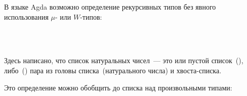 
В языке Agda возможно определение рекурсивных типов без явного
использования $\mu$- или $W$-типов:

\begin{code}%
\>  \AgdaSymbol{:}  \<%
\\
\>[0]\<[2]%
\>[2]\AgdaInductiveConstructor{[]} \AgdaSymbol{:} \<%
\\
\>[0]\<[2]%
\>[2] \AgdaSymbol{:} \AgdaSymbol{(} \AgdaSymbol{:} \AgdaSymbol{)}  \AgdaSymbol{(} \AgdaSymbol{:} \AgdaSymbol{)}  \<%
\end{code}

Здесь написано, что список натуральных чисел~--- это или пустой
список~(\AgdaInductiveConstructor{[]}),
либо~() пара из головы
списка~(натурального числа) и хвоста-списка.

Это определение можно обобщить до списка над произвольными типами:

\begin{code}%
\>  \AgdaSymbol{(} \AgdaSymbol{:} \AgdaSymbol{)} \AgdaSymbol{:}  \<%
\\
\>[0]\<[2]%
\>[2]\AgdaInductiveConstructor{[]} \AgdaSymbol{:}  \<%
\\
\>[0]\<[2]%
\>[2] \AgdaSymbol{:} \AgdaSymbol{(} \AgdaSymbol{:} \AgdaSymbol{)}  \AgdaSymbol{(} \AgdaSymbol{:}  \AgdaSymbol{)}   \<%
\end{code}
